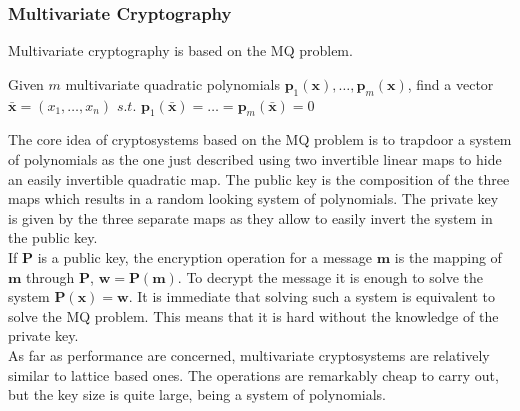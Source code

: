 \subsubsection{Multivariate Cryptography}
Multivariate cryptography is based on the MQ problem.
\begin{definition}[MQ Problem]
Given $m$ multivariate quadratic polynomials $\mathbf{p}_1(\mathbf{x}),\ldots,\mathbf{p}_m(\mathbf{x})$, find a vector $\bar{\mathbf{x}}=(x_1,\ldots,x_n)$ $s.t.$ $\mathbf{p}_1(\bar{\mathbf{x}})=\ldots=\mathbf{p}_m(\bar{\mathbf{x}})=0$
\end{definition}
The core idea of cryptosystems based on the MQ problem is to trapdoor a system of polynomials as the one just described using two invertible linear maps to hide an easily invertible quadratic map. The public key is the composition of the three maps which results in a random looking system of polynomials. The private key is given by the three separate maps as they allow to easily invert the system in the public key.\\
If $\mathbf{P}$ is a public key, the encryption operation for a message $\mathbf{m}$ is the mapping of $\mathbf{m}$ through $\mathbf{P}$, $\mathbf{w}=\mathbf{P}(\mathbf{m})$. To decrypt the message it is enough to solve the system $\mathbf{P}(\mathbf{x})=\mathbf{w}$. It is immediate that solving such a system is equivalent to solve the MQ problem. This means that it is hard without the knowledge of the private key.\\
As far as performance are concerned, multivariate cryptosystems are relatively similar to lattice based ones. The operations are remarkably cheap to carry out, but the key size is quite large, being a system of polynomials.

